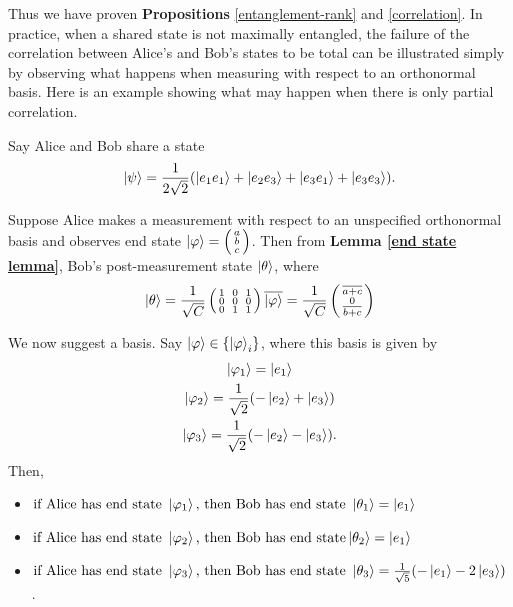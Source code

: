 
Thus we have proven {\bf{Propositions}} \ref{entanglement-rank} and \ref{correlation}.  In practice, when a shared state is not maximally entangled, the failure of the correlation between Alice's and Bob's states to be total can be illustrated simply by observing what happens when measuring with respect to an orthonormal basis.  Here is an example showing what may happen when there is only partial correlation.
\begin{example}
\label{example rank not full}
Say Alice and Bob share a state $$\ket{\psi}=\frac{1}{2\sqrt{2}}(\ket{e_1 e_1}+\ket{e_2 e_3}+\ket{e_3 e_1}+\ket{e_3 e_3}).$$

Suppose Alice makes a measurement with respect to an unspecified orthonormal basis and observes end state  $\ket{\varphi}=\left(\begin{smallmatrix}a\\b\\c\end{smallmatrix}\right)$.  Then from \textbf{Lemma \ref{end state lemma}}, Bob's post-measurement state $\ket{\theta}$, where 
\begin{equation*} \label{eqn:example-theta}
\ket{\theta}=\frac{1}{\sqrt{C}}\left(\begin{smallmatrix}
1 && 0 && 1\\
0 && 0 && 0\\
0 && 1 && 1\\
\end{smallmatrix}\right)\overline{\ket{\varphi}}=\frac{1}{\sqrt{C}}\left(\begin{smallmatrix}
\overline{a+c}\\
0\\
\overline{b+c}\end{smallmatrix}\right)
\end{equation*}

 We now suggest a basis.  Say $\ket{\varphi} \in \{ \ket{\varphi}_i\}$, where this basis is given by
    \begin{gather}
    \ket{\varphi_1}=\ket{e_1}\\ \ket{\varphi_2}=\frac{1}{\sqrt{2}}(-\ket{e_2}+\ket{e_3})\\
    \ket{\varphi_3}=\frac{1}{\sqrt{2}}(-\ket{e_2}-\ket{e_3}).
    \end{gather}
Then, 
\begin{itemize}
\item $\textrm{if Alice has end state }\ket{\varphi_1} \textrm{, then Bob has end state } \ket{\theta_1}=\ket{e_1}$
\item $\textrm{if Alice has end state }\ket{\varphi_2} \textrm{, then Bob has end state} \ket{\theta_2}=\ket{e_1}$
\item $\textrm{if Alice has end state }\ket{\varphi_3} \textrm{, then Bob has end state }\ket{\theta_3}=\frac{1}{\sqrt{5}}(-\ket{e_1}-2\ket{e_3})$.
\end{itemize}



\end{example}
